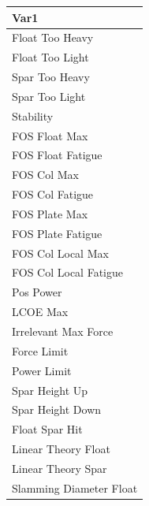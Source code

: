 \begin{tabular}{l}
Var1\\ 
\hline 
Float Too Heavy  \\ 
Float Too Light  \\ 
Spar Too Heavy  \\ 
Spar Too Light  \\ 
Stability  \\ 
FOS Float Max  \\ 
FOS Float Fatigue  \\ 
FOS Col Max  \\ 
FOS Col Fatigue  \\ 
FOS Plate Max  \\ 
FOS Plate Fatigue  \\ 
FOS Col Local Max  \\ 
FOS Col Local Fatigue  \\ 
Pos Power  \\ 
LCOE Max  \\ 
Irrelevant Max Force  \\ 
Force Limit  \\ 
Power Limit  \\ 
Spar Height Up  \\ 
Spar Height Down  \\ 
Float Spar Hit  \\ 
Linear Theory Float  \\ 
Linear Theory Spar  \\ 
Slamming Diameter Float  \\ 
\end{tabular}